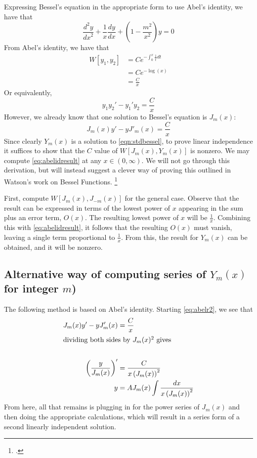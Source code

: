 \documentclass[]{article}
\begin{document}
Expressing Bessel's equation in the appropriate form to use Abel's identity, we have that 
\begin{equation} \label{eqn:stdbessel}
	\frac{d^2y}{{dx}^2} + \frac{1}{x}\frac{dy}{dx} + (1 - \frac{m^2}{x^2})y = 0
\end{equation}
From Abel's identity, we have that
\begin{align}
	W[y_1,y_2] &= C e^{-\int_0^x \frac{1}{t}dt} \\
	&= Ce^{-\log(x)} \nonumber \\
	&= \frac{C}{x}
\end{align}
Or equivalently,
\begin{equation} \label{eq:abelidresult}
	y_1y_2' - y_1'y_2 = \frac{C}{x} 
\end{equation}
However, we already know that one solution to Bessel's equation is $J_m(x)$:
\begin{equation} \label{eq:abelr2}
	J_m(x)y' - yJ'_m(x) = \frac{C}{x}
\end{equation}
Since clearly $Y_m(x)$ is a solution to \eqref{eqn:stdbessel}, to prove linear independence it suffices to show that the $C$ value of $W[J_m(x),Y_m(x)]$ is nonzero. We may compute \eqref{eq:abelidresult} at any $x \in (0,\infty)$. We will not go through this derivation, but will instead suggest a clever way of proving this outlined in Watson's work on Bessel Functions. \footcite{Watson: A Treatise on the Theory of Bessel Functions, 2nd ed}

First, compute $W[J_m(x),J_{-m}(x)]$ for the general case. Observe that the result can be expressed in terms of the lowest power of $x$ appearing in the sum plus an error term, $O(x)$. The resulting lowest power of $x$ will be $\frac{1}{x}$. Combining this with \eqref{eq:abelidresult}, it follows that the resulting $O(x)$ must vanish, leaving a single term proportional to $\frac{1}{x}$. From this, the result for $Y_m(x)$ can be obtained, and it will be nonzero.
\subsection{Alternative way of computing series of $Y_m(x)$ for integer $m$)}
The following method is based on Abel's identity. Starting \eqref{eq:abelr2}, we see that
\begin{align}
	J_m(x)y' - yJ'_m(x) &= \frac{C}{x} \nonumber \\
	\intertext{dividing both sides by $J_m(x)^2$ gives} \nonumber\\
	\left(\frac{y}{J_m(x)}\right)' &= \frac{C}{x\left(J_m(x)\right)^2} \nonumber \\
	 y &= AJ_m(x)\int \frac{dx}{x\left(J_m(x) \right)^2} \label{eq:abelr3}
\end{align}
From here, all that remains is plugging in for the power series of $J_m(x)$ and then doing the appropriate calculations, which will result in a series form of a second linearly independent solution.
\end{document}
